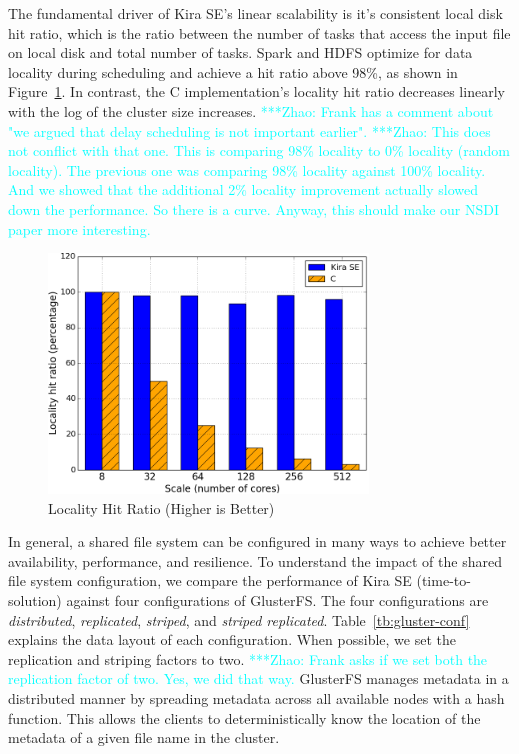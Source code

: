 \documentclass[conference]{IEEEtran}
\newcommand{\zhaonote}[1]{{\textcolor{cyan}    { ***Zhao:      #1 }}}
\newcommand{\zhaonote}[1]{}
\newcommand{\up}{\vspace*{-1em}}
\begin{document}
The fundamental driver of Kira SE's linear scalability is it's consistent local disk
hit ratio, which is the ratio between the number of tasks that access the input file 
on local disk and total number of tasks. Spark and HDFS optimize for data locality during scheduling and achieve a
hit ratio above 98\%, as shown in Figure~\ref{fig:locality}. In contrast, the
C implementation's locality hit ratio decreases linearly with the log of the cluster
size increases.
\zhaonote{Frank has a comment about "we argued that delay scheduling is not important earlier".}
\zhaonote{This does not conflict with that one. This is comparing 98\% locality to 0\% locality (random locality).
The previous one was comparing 98\% locality against 100\% locality. And we showed that the additional 2\% 
locality improvement actually slowed down the performance. So there is a curve. Anyway, this should make
our NSDI paper more interesting.}

\begin{figure}[h]
	\begin{center}
		\includegraphics[width=85mm]{pictures/locality}
		\caption{Locality Hit Ratio (Higher is Better)
		\label{fig:locality}}
		\up\up
  	\end{center}
\end{figure}

In general, a shared file system can be configured in many ways to achieve better
availability, performance, and resilience. To understand the impact of the shared
file system configuration, we compare the performance of Kira SE (time-to-solution)
against four configurations of GlusterFS. The four configurations are
\emph{distributed}, \emph{replicated}, \emph{striped}, and \emph{striped replicated}. 
Table~\ref{tb:gluster-conf} explains the data layout of each configuration.
When possible, we set the replication and striping factors to two.
\zhaonote{Frank asks if we set both the replication factor of two. Yes, we did that way.}
GlusterFS manages metadata in a distributed manner by spreading metadata across
all available nodes with a hash function. This allows the clients to deterministically
know the location of the metadata of a given file name in the cluster.
\end{document}
